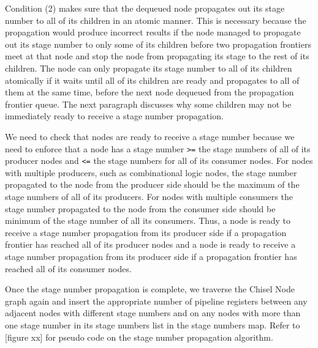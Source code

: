 Condition (2) makes sure that the dequeued node propagates out its stage number to all of its children in an atomic manner. This is necessary because the propagation would produce incorrect results if the node managed to propagate out its stage number to only some of its children before two propagation frontiers meet at that node and stop the node from propagating its stage to the rest of its children. The node can only propagate its stage number to all of its children atomically if it waits until all of its children are ready and propagates to all of them at the same time, before the next node dequeued from the propagation frontier queue. The next paragraph discusses why some children may not be immediately ready to receive a stage number propagation.

We need to check that nodes are ready to receive a stage number because we need to enforce that a node has a stage number {\tt >=} the stage numbers of all of its producer nodes and {\tt <=} the stage numbers for all of its consumer nodes. For nodes with multiple producers, such as combinational logic nodes, the stage number propagated to the node from the producer side should be the maximum of the stage numbers of all of its producers. For nodes with multiple consumers the stage number propagated to the node from the consumer side should be minimum of the stage number of all its consumers. Thus, a node is ready to receive a stage number propagation from its producer side if a propagation frontier has reached all of its producer nodes and a node is ready to receive a stage number propagation from its producer side if a propagation frontier has reached all of its consumer nodes.

Once the stage number propagation is complete, we traverse the Chisel Node graph again and insert the appropriate number of pipeline registers between any adjacent nodes with different stage numbers and on any nodes with more than one stage number in its stage numbers list in the stage numbers map. Refer to [figure xx] for pseudo code on the stage number propagation algorithm.
